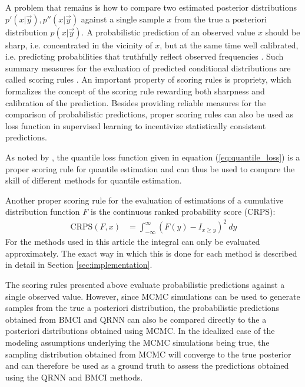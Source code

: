 \documentclass[journal abbreviation, manuscript]{copernicus}
\begin{document}
  A problem that remains is how to compare two estimated posterior distributions
  $p'(x | \vec{y}), p''(x | \vec{y})$ against a single sample $x$ from the true
  a posteriori distribution $p(x | \vec{y})$. A probabilistic prediction of an
  observed value $x$ should be sharp, i.e. concentrated in the vicinity of
  $x$, but at the same time well calibrated, i.e. predicting probabilities
  that truthfully reflect observed frequencies \citep{gneiting_2}. Such summary
  measures for the evaluation of predicted conditional distributions are called
  scoring rules \citep{gneiting}. An important property of scoring rules
  is propriety, which formalizes the concept of the scoring rule rewarding both
  sharpness and calibration of the prediction. Besides providing reliable
  measures for the comparison of probabilistic predictions, proper scoring rules
  can also be used as loss function in supervised learning to incentivize
  statistically consistent predictions.

  As noted by \cite{gneiting}, the quantile loss function given in equation
  (\ref{eq:quantile_loss}) is a proper scoring rule for quantile estimation
  and can thus  be used to compare the skill of different methods for
  quantile estimation.

  Another proper scoring rule for the evaluation of estimations of a
  cumulative distribution function $F$ is the continuous ranked probability
  score (CRPS):
  \begin{align}\label{eq:crps}
    \text{CRPS}(F, x) &= \int_{-\infty}^{\infty} 
    \left ( F(y) - I_{x \geq y} \right )^2 \: dy
  \end{align}
  For the methods used in this article the integral  can only
  be evaluated approximately. The exact way in which this is done for each
  method is described in detail in Section \ref{sec:implementation}.

  The scoring rules presented above evaluate probabilistic predictions against a
  single observed value. However, since MCMC simulations can be used to generate
  samples from the true a posteriori distribution, the probabilistic predictions
  obtained from BMCI and QRNN can also be compared directly to the a posteriori
  distributions obtained using MCMC. In the idealized case of the modeling
  assumptions underlying the MCMC simulations being true, the sampling
  distribution obtained from MCMC will converge to the true posterior and can
  therefore be used as a ground truth to assess the predictions obtained using
  the QRNN and BMCI methods.
\end{document}
